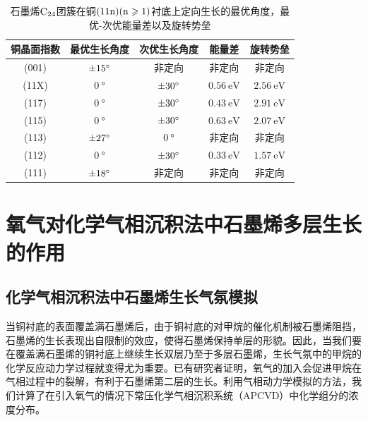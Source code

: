 \begin{table}[htb]
    \caption{石墨烯$\rm{C_{24}}$团簇在铜$\rm{(11n)(n \geqslant 1)}$衬底上定向生长的最优角度，最优-次优能量差以及旋转势垒}
    \centering
    \begin{tabular}{ccccc}
        \toprule
        铜晶面指数 & 最优生长角度            & 次优生长角度           & 能量差  & 旋转势垒 \\
        \midrule
        (001)      & $\SI{\pm 15 }{\degree}$ & 非定向                 & 非定向                      & 非定向                       \\
        (11X)      & $\SI{0}{\degree}$       & $\SI{\pm 30}{\degree}$ & $\SI{0.56 }{\electronvolt}$ & $\SI{2.56 }{\electronvolt}$  \\
        (117)      & $\SI{0}{\degree}$       & $\SI{\pm 30}{\degree}$ & $\SI{0.43 }{\electronvolt}$ & $\SI{2.91 }{\electronvolt}$  \\
        (115)      & $\SI{0}{\degree}$       & $\SI{\pm 30}{\degree}$ & $\SI{0.63 }{\electronvolt}$ & $\SI{2.07}{\electronvolt}$  \\
        (113)      & $\SI{\pm 27}{\degree}$  & $\SI{0}{\degree}$      & 非定向                      & 非定向                       \\
        (112)      & $\SI{0}{\degree}$       & $\SI{\pm 30}{\degree}$ & $\SI{0.33 }{\electronvolt}$ & $\SI{1.57 }{\electronvolt}$  \\
        (111)      & $\SI{\pm 18 }{\degree}$ & 非定向                 & 非定向                      & 非定向                       \\
        \bottomrule
    \end{tabular}
    \label{tab:GO_energyDiff_barrier}
\end{table}

\section{氧气对化学气相沉积法中石墨烯多层生长的作用}
\label{sec:石墨烯氧蚀刻穿透}
\def\muO#1{\mu_{\rm O}^{\rm #1} \it}
\def\halfEOm{ \frac{1}{2}E_{\rm \cemb{O2}} \it}
\def\EOa{\it E_{\rm O} \it }
\def\Cdis{\rm{\left[C_{dis.}\right]} \it }
\def\Oads{\rm{\left[O_{ads.}\right]} \it }
\def\RateV#1#2{\nu_{\rm #1}^{\rm #2} \it }
\def\RateK#1#2{\it{k_{\rm #1}^{\rm #2}} \it }
\def\ReactTime#1#2{\it{t_{\rm #1}^{\rm #2}} \it }

\subsection{化学气相沉积法中石墨烯生长气氛模拟}
\label{subsec:FLG_gasPhase}
当铜衬底的表面覆盖满石墨烯后，由于铜衬底的对甲烷的催化机制被石墨烯阻挡，石墨烯的生长表现出自限制的效应，使得石墨烯保持单层的形貌。因此，当我们要在覆盖满石墨烯的铜衬底上继续生长双层乃至于多层石墨烯，生长气氛中的甲烷的化学反应动力学过程就变得尤为重要。已有研究者证明，氧气的加入会促进甲烷在气相过程中的裂解，有利于石墨烯第二层的生长。利用气相动力学模拟的方法，我们计算了在引入氧气的情况下常压化学气相沉积系统（APCVD）中化学组分的浓度分布。

